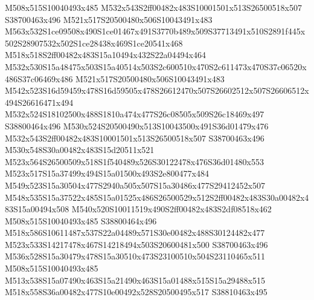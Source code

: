 \documentclass{article}
\begin{document}
\begin{multicols}{2}
M508x515S10040493x485 M532x543S2ff00482x483S10001501x513S26500518x507 S38700463x496 M521x517S20500480x506S10043491x483 M563x532S1ce09508x490S1ce01467x491S3770b489x509S37713491x510S2891f445x502S28907532x502S1ce28438x469S1ce20541x468 M518x518S2ff00482x483S15a10494x432S22a04494x464 M532x530S15a48475x503S15a40514x503S2c600510x470S2c611473x470S37c06520x486S37c06469x486 M521x517S20500480x506S10043491x483 M542x523S16d59459x478S16d59505x478S26612470x507S26602512x507S26606512x494S26616471x494 M532x524S18102500x488S1810a474x477S26c08505x509S26c18469x497 S38800464x496 M530x524S20500490x513S10043500x491S36d01479x476 M532x543S2ff00482x483S10001501x513S26500518x507 S38700463x496 M530x548S30a00482x483S15d20511x521 M523x564S26500509x518S1f540489x526S30122478x476S36d01480x553 M523x517S15a37499x494S15a01500x493S2e800477x484 M549x523S15a30504x477S2940a505x507S15a30486x477S29412452x507 M548x535S15a37522x485S15a01525x486S26500529x512S2ff00482x483S30a00482x483S15a00494x508 M540x520S10011519x490S2ff00482x483S2df08518x462 M508x515S10040493x485 S38800464x496 M518x586S10611487x537S22a04489x571S30e00482x488S30124482x477 M523x533S14217478x467S14218494x503S20600481x500 S38700463x496 M536x528S15a30479x478S15a30510x473S23100510x504S23110465x511 M508x515S10040493x485 M513x538S15a07490x463S15a21490x463S15a01488x515S15a29488x515 M518x558S36a00482x477S10e00492x528S20500495x517 S38810463x495









\end{multicols}
\end{document}
